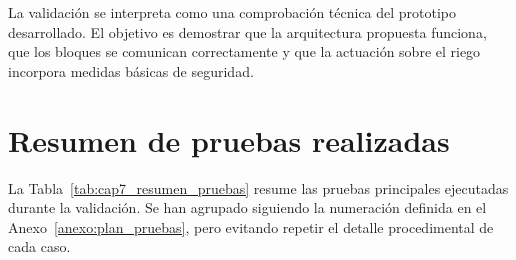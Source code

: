 La validación se interpreta como una comprobación técnica del prototipo desarrollado. El objetivo es demostrar que la arquitectura propuesta funciona, que los bloques se comunican correctamente y que la actuación sobre el riego incorpora medidas básicas de seguridad.

\section{Resumen de pruebas realizadas}
\label{sec:resumen_pruebas_realizadas}

La Tabla~\ref{tab:cap7_resumen_pruebas} resume las pruebas principales ejecutadas durante la validación. Se han agrupado siguiendo la numeración definida en el Anexo~\ref{anexo:plan_pruebas}, pero evitando repetir el detalle procedimental de cada caso.


